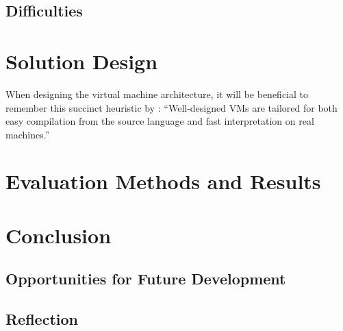 	\section{Difficulties}

\chapter{Solution Design}
	When designing the virtual machine architecture, it will be beneficial to remember this succinct heuristic by \cite{structureinterpreters}: ``Well-designed VMs are tailored for both easy compilation from the source language and fast interpretation on real machines.''

\chapter{Evaluation Methods and Results}

\chapter{Conclusion}
	
	\section{Opportunities for Future Development}
	
	\section{Reflection}

\bibliographysection

